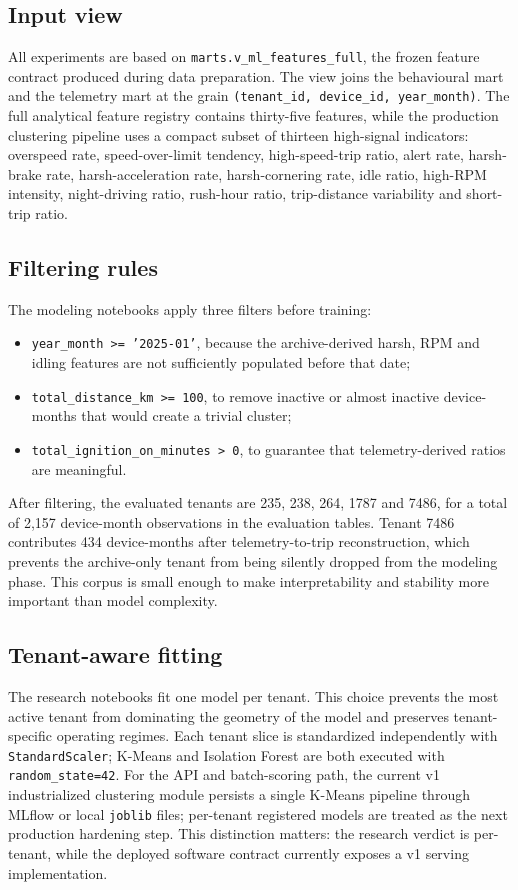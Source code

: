 \subsection{Input view}
All experiments are based on \texttt{marts.v\_ml\_features\_full}, the frozen feature contract produced during data preparation. The view joins the behavioural mart and the telemetry mart at the grain \texttt{(tenant\_id, device\_id, year\_month)}. The full analytical feature registry contains thirty-five features, while the production clustering pipeline uses a compact subset of thirteen high-signal indicators: overspeed rate, speed-over-limit tendency, high-speed-trip ratio, alert rate, harsh-brake rate, harsh-acceleration rate, harsh-cornering rate, idle ratio, high-RPM intensity, night-driving ratio, rush-hour ratio, trip-distance variability and short-trip ratio.

\subsection{Filtering rules}
The modeling notebooks apply three filters before training:

\begin{itemize}
    \item \texttt{year\_month >= '2025-01'}, because the archive-derived harsh, RPM and idling features are not sufficiently populated before that date;
    \item \texttt{total\_distance\_km >= 100}, to remove inactive or almost inactive device-months that would create a trivial cluster;
    \item \texttt{total\_ignition\_on\_minutes > 0}, to guarantee that telemetry-derived ratios are meaningful.
\end{itemize}

After filtering, the evaluated tenants are 235, 238, 264, 1787 and 7486, for a total of 2{,}157 device-month observations in the evaluation tables. Tenant 7486 contributes 434 device-months after telemetry-to-trip reconstruction, which prevents the archive-only tenant from being silently dropped from the modeling phase. This corpus is small enough to make interpretability and stability more important than model complexity.

\subsection{Tenant-aware fitting}
The research notebooks fit one model per tenant. This choice prevents the most active tenant from dominating the geometry of the model and preserves tenant-specific operating regimes. Each tenant slice is standardized independently with \texttt{StandardScaler}; K-Means and Isolation Forest are both executed with \texttt{random\_state=42}. For the API and batch-scoring path, the current v1 industrialized clustering module persists a single K-Means pipeline through MLflow or local \texttt{joblib} files; per-tenant registered models are treated as the next production hardening step. This distinction matters: the research verdict is per-tenant, while the deployed software contract currently exposes a v1 serving implementation.


